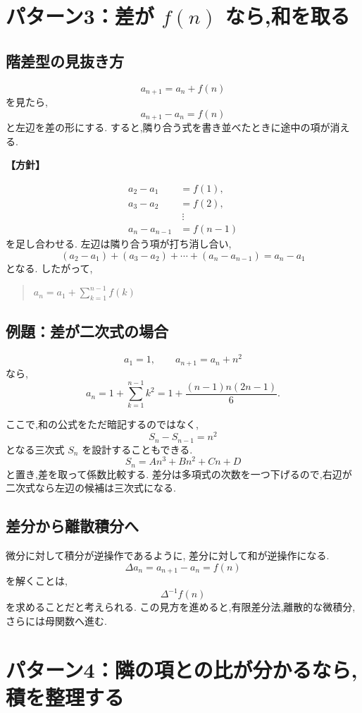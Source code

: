 \section{パターン3：差が $f(n)$ なら,和を取る}

\subsection{階差型の見抜き方}

\[
  a_{n+1}=a_n+f(n)
\]
を見たら,
\[
  a_{n+1}-a_n=f(n)
\]
と左辺を差の形にする.
すると,隣り合う式を書き並べたときに途中の項が消える.

\noindent\textbf{【方針】}

\[
\begin{aligned}
  a_2-a_1&=f(1),\\
  a_3-a_2&=f(2),\\
  &\ \vdots\\
  a_n-a_{n-1}&=f(n-1)
\end{aligned}
\]
を足し合わせる.
左辺は隣り合う項が打ち消し合い,
\[
  (a_2-a_1)+(a_3-a_2)+\cdots+(a_n-a_{n-1})
  =a_n-a_1
\]
となる.
したがって,
\begin{quote}
  $a_n=a_1+\sum_{k=1}^{n-1}f(k)$
\end{quote}

\subsection{例題：差が二次式の場合}

\[
  a_1=1,\qquad a_{n+1}=a_n+n^2
\]
なら,
\[
  a_n=1+\sum_{k=1}^{n-1}k^2
  =1+\frac{(n-1)n(2n-1)}6.
\]

ここで,和の公式をただ暗記するのではなく,
\[
  S_n-S_{n-1}=n^2
\]
となる三次式 $S_n$ を設計することもできる.
\[
  S_n=An^3+Bn^2+Cn+D
\]
と置き,差を取って係数比較する.
差分は多項式の次数を一つ下げるので,右辺が二次式なら左辺の候補は三次式になる.

\subsection{差分から離散積分へ}

微分に対して積分が逆操作であるように,
差分に対して和が逆操作になる.
\[
  \Delta a_n=a_{n+1}-a_n=f(n)
\]
を解くことは,
\[
  \Delta^{-1}f(n)
\]
を求めることだと考えられる.
この見方を進めると,有限差分法,離散的な微積分,
さらには母関数へ進む.

\section{パターン4：隣の項との比が分かるなら,積を整理する}

